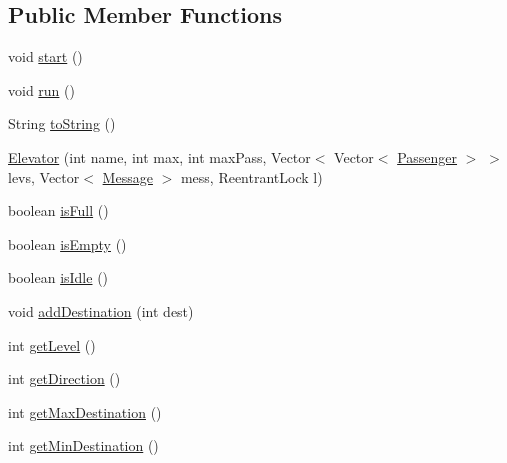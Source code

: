 \subsection*{Public Member Functions}
\begin{DoxyCompactItemize}
\item 
void \hyperlink{classcn_1_1leonwong_1_1_elevator_simulator_1_1_model_1_1_elevator_a45bf0b0add86d6c9f4624aa91804d3c9}{start} ()
\item 
void \hyperlink{classcn_1_1leonwong_1_1_elevator_simulator_1_1_model_1_1_elevator_af9cb9d7e34873bc531ec71aa4ed3deae}{run} ()
\item 
String \hyperlink{classcn_1_1leonwong_1_1_elevator_simulator_1_1_model_1_1_elevator_a40f92b8d5f76462a4894e4b4bd670458}{to\+String} ()
\item 
\hyperlink{classcn_1_1leonwong_1_1_elevator_simulator_1_1_model_1_1_elevator_a8cdebccdd3505647fe57df5ea4315c1a}{Elevator} (int name, int max, int max\+Pass, Vector$<$ Vector$<$ \hyperlink{classcn_1_1leonwong_1_1_elevator_simulator_1_1_model_1_1_passenger}{Passenger} $>$ $>$ levs, Vector$<$ \hyperlink{classcn_1_1leonwong_1_1_elevator_simulator_1_1_model_1_1_message}{Message} $>$ mess, Reentrant\+Lock l)
\item 
boolean \hyperlink{classcn_1_1leonwong_1_1_elevator_simulator_1_1_model_1_1_elevator_a6abc5ffe66c8be2d11493fb9d9a2022f}{is\+Full} ()
\item 
boolean \hyperlink{classcn_1_1leonwong_1_1_elevator_simulator_1_1_model_1_1_elevator_a524eaa48c98d600d587c9e81f47e477b}{is\+Empty} ()
\item 
boolean \hyperlink{classcn_1_1leonwong_1_1_elevator_simulator_1_1_model_1_1_elevator_afef928208c5445a18af5d567ce9a4467}{is\+Idle} ()
\item 
void \hyperlink{classcn_1_1leonwong_1_1_elevator_simulator_1_1_model_1_1_elevator_ad735b8fd22b1b990a02caa95a9c8b96f}{add\+Destination} (int dest)
\item 
int \hyperlink{classcn_1_1leonwong_1_1_elevator_simulator_1_1_model_1_1_elevator_a393eaa2daf4a00730685de6efb3893d5}{get\+Level} ()
\item 
int \hyperlink{classcn_1_1leonwong_1_1_elevator_simulator_1_1_model_1_1_elevator_a0a386b72bfc7edf9a64dcc342dd27f51}{get\+Direction} ()
\item 
int \hyperlink{classcn_1_1leonwong_1_1_elevator_simulator_1_1_model_1_1_elevator_acc5b1cdd5cefc853a1cd33e6e986b3a0}{get\+Max\+Destination} ()
\item 
int \hyperlink{classcn_1_1leonwong_1_1_elevator_simulator_1_1_model_1_1_elevator_a9aeca7de346d6a46aea0692a60e57681}{get\+Min\+Destination} ()

\end{DoxyCompactItemize}
